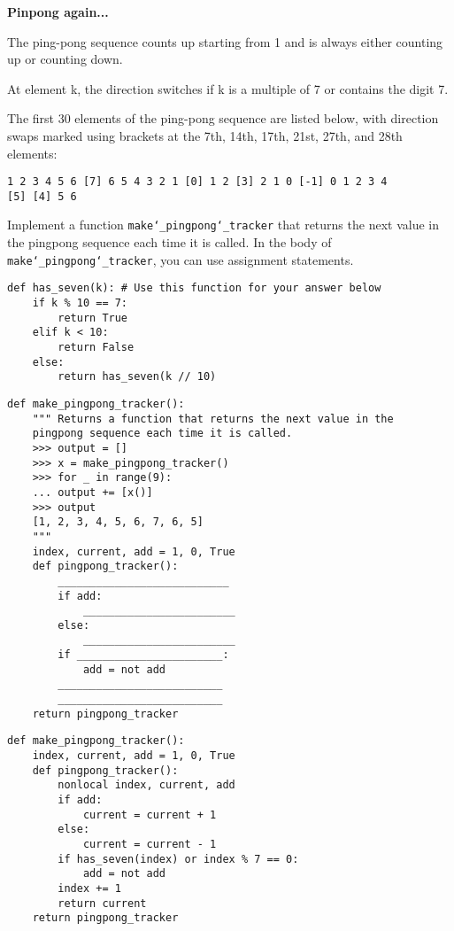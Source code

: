 \begin{blocksection}
\question \textbf{Pinpong again...}\\
\begin{nonsol}
The ping-pong sequence counts up starting from 1 and is
always either counting up or counting down.

At element k, the direction switches if k is a multiple of 7 or contains the
digit 7.

The first 30 elements of the ping-pong sequence are listed below, with direction
swaps marked using brackets at the 7th, 14th, 17th, 21st, 27th, and 28th
elements:
\begin{lstlisting}
1 2 3 4 5 6 [7] 6 5 4 3 2 1 [0] 1 2 [3] 2 1 0 [-1] 0 1 2 3 4
[5] [4] 5 6
\end{lstlisting}
\end{nonsol}

Implement a function \texttt{make\char`_pingpong\char`_tracker} that returns the
next value in the pingpong sequence each time it is called. In the body of
\texttt{make\char`_pingpong\char`_tracker}, you can use assignment statements.
\newline

\begin{lstlisting}
def has_seven(k): # Use this function for your answer below
    if k % 10 == 7:
        return True
    elif k < 10:
        return False
    else:
        return has_seven(k // 10)
\end{lstlisting}

\begin{nonsol}
\begin{lstlisting}
def make_pingpong_tracker():
    """ Returns a function that returns the next value in the
    pingpong sequence each time it is called.
    >>> output = []
    >>> x = make_pingpong_tracker()
    >>> for _ in range(9):
    ... output += [x()]
    >>> output
    [1, 2, 3, 4, 5, 6, 7, 6, 5]
    """
    index, current, add = 1, 0, True
    def pingpong_tracker():
        ___________________________
        if add:
            ________________________
        else:
            ________________________
        if _______________________:
            add = not add
        __________________________
        __________________________
    return pingpong_tracker

\end{lstlisting}
\end{nonsol}

\begin{solution}
\begin{lstlisting}
def make_pingpong_tracker():
    index, current, add = 1, 0, True
    def pingpong_tracker():
        nonlocal index, current, add
        if add:
            current = current + 1
        else:
            current = current - 1
        if has_seven(index) or index % 7 == 0:
            add = not add
        index += 1
        return current
    return pingpong_tracker
\end{lstlisting}
\end{solution}

\end{blocksection}


